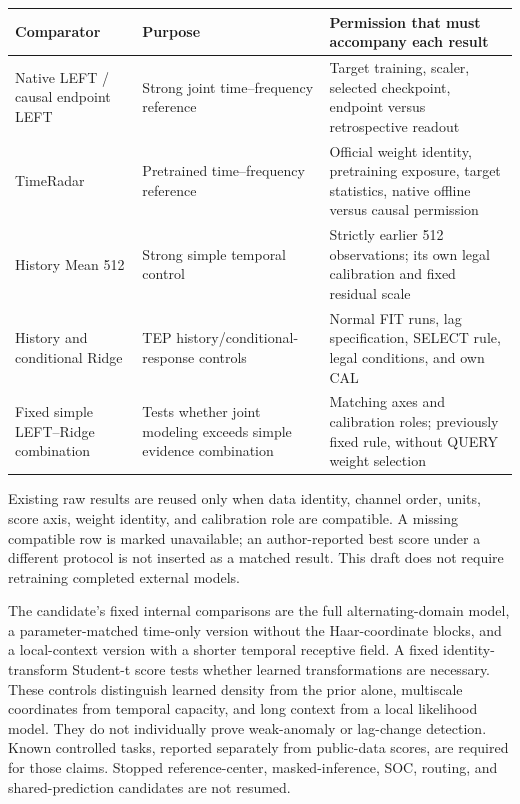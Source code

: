 \documentclass[
  english,
]{article}
\begin{document}
\begin{longtable}[]{@{}
  >{\raggedright\arraybackslash}p{}
  >{\raggedright\arraybackslash}p{}
  >{\raggedright\arraybackslash}p{}@{}}
\toprule\noalign{}
\begin{minipage}[b]{\linewidth}\raggedright
Comparator
\end{minipage} & \begin{minipage}[b]{\linewidth}\raggedright
Purpose
\end{minipage} & \begin{minipage}[b]{\linewidth}\raggedright
Permission that must accompany each result
\end{minipage} \\
\midrule\noalign{}
\endhead
\bottomrule\noalign{}
\endlastfoot
Native LEFT / causal endpoint LEFT & Strong joint time--frequency
reference & Target training, scaler, selected checkpoint, endpoint
versus retrospective readout \\
TimeRadar & Pretrained time--frequency reference & Official weight
identity, pretraining exposure, target statistics, native offline versus
causal permission \\
History Mean 512 & Strong simple temporal control & Strictly earlier 512
observations; its own legal calibration and fixed residual scale \\
History and conditional Ridge & TEP history/conditional-response
controls & Normal FIT runs, lag specification, SELECT rule, legal
conditions, and own CAL \\
Fixed simple LEFT--Ridge combination & Tests whether joint modeling
exceeds simple evidence combination & Matching axes and calibration
roles; previously fixed rule, without QUERY weight selection \\
\end{longtable}

Existing raw results are reused only when data identity, channel order,
units, score axis, weight identity, and calibration role are compatible.
A missing compatible row is marked unavailable; an author-reported best
score under a different protocol is not inserted as a matched result.
This draft does not require retraining completed external models.

The candidate's fixed internal comparisons are the full
alternating-domain model, a parameter-matched time-only version without
the Haar-coordinate blocks, and a local-context version with a shorter
temporal receptive field. A fixed identity-transform Student-t score
tests whether learned transformations are necessary. These controls
distinguish learned density from the prior alone, multiscale coordinates
from temporal capacity, and long context from a local likelihood model.
They do not individually prove weak-anomaly or lag-change detection.
Known controlled tasks, reported separately from public-data scores, are
required for those claims. Stopped reference-center, masked-inference,
SOC, routing, and shared-prediction candidates are not resumed.
\end{document}
